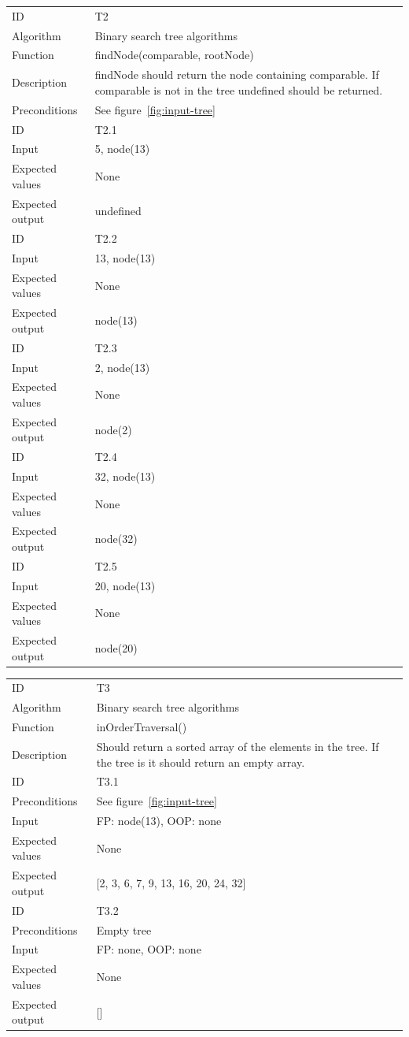 \documentclass {article}
\begin{document}
\begin{tabular}{ | l p{10cm} | }
\hline
ID & T2 \\
Algorithm & Binary search tree algorithms \\
Function & findNode(comparable, rootNode) \\
Description & findNode should return the node containing comparable. If comparable is not in the tree undefined should be returned. \\
Preconditions & See figure~\ref{fig:input-tree} \\
\hline
ID & T2.1 \\
Input & 5, node(13) \\
Expected values & None \\
Expected output & undefined \\
\hline
ID & T2.2 \\
Input & 13, node(13) \\
Expected values & None \\
Expected output & node(13) \\
\hline
ID & T2.3 \\
Input & 2, node(13) \\
Expected values & None \\
Expected output & node(2) \\
\hline
ID & T2.4 \\
Input & 32, node(13) \\
Expected values & None \\
Expected output & node(32) \\
\hline
ID & T2.5 \\
Input & 20, node(13) \\
Expected values & None \\
Expected output & node(20) \\
\hline
\end{tabular}

\begin{tabular}{ | l p{10cm} | }
\hline
ID & T3 \\
Algorithm & Binary search tree algorithms \\
Function & inOrderTraversal() \\
Description & Should return a sorted array of the elements in the tree. If the tree is it should return an empty array. \\
\hline
ID & T3.1 \\
Preconditions & See figure~\ref{fig:input-tree} \\
Input & FP: node(13), OOP: none \\
Expected values & None \\
Expected output &  [2, 3, 6, 7, 9, 13, 16, 20, 24, 32] \\
\hline
ID & T3.2 \\
Preconditions & Empty tree \\
Input & FP: none, OOP: none \\
Expected values & None \\
Expected output & [] \\
\hline
\end{tabular}
\end{document}
